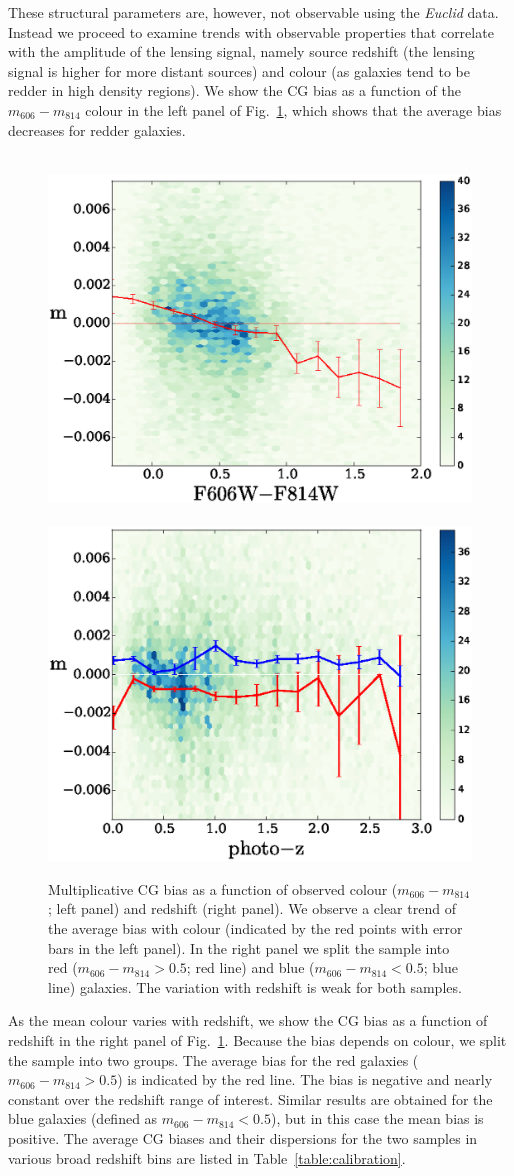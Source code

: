 \documentclass[useAMS,usenatbib]{mnras}
\begin{document}
These structural parameters are, however, not observable using the {\it Euclid} data. Instead we proceed to examine trends with observable properties that correlate with the amplitude of the lensing signal, namely source redshift (the lensing signal is higher for more distant sources) and colour (as galaxies tend to be redder in high density regions). We show the CG bias as a function of the $m_{606}-m_{814}$ colour in the left panel of Fig.~\ref{fig:cg2color}, which shows that the average bias decreases for redder galaxies.

%
\begin{figure}
\hbox{%
\includegraphics[width=0.5\hsize]{zheatcolor29.eps}
\includegraphics[width=0.5\hsize]{zphotozheat29.eps}}
\caption{Multiplicative CG bias as a function of observed colour ($m_{606}-m_{814}$; left panel)
and redshift (right panel). We observe a clear trend of the average bias with colour (indicated by
the red points with error bars in the left panel). In the right panel we split the sample into red
($m_{606}-m_{814}>0.5$; red line) and blue ($m_{606}-m_{814}<0.5$; blue line) galaxies. The
variation with redshift is weak for both samples.}
\label{fig:cg2color}
\end{figure}


As the mean colour varies with redshift, we show the CG bias as a function of redshift in the right panel of
Fig.~\ref{fig:cg2color}.  Because the bias depends on colour, we split the sample into two groups. The average bias for the red galaxies ($m_{606}-m_{814}>0.5$) is indicated by the red line. The bias is negative and nearly constant over the redshift range of interest. Similar results are obtained for the blue galaxies
(defined as $m_{606}-m_{814}<0.5$), but in this case the mean bias is positive. The average CG biases and their dispersions for the two samples in various broad redshift bins are listed in Table~\ref{table:calibration}.
\end{document}
